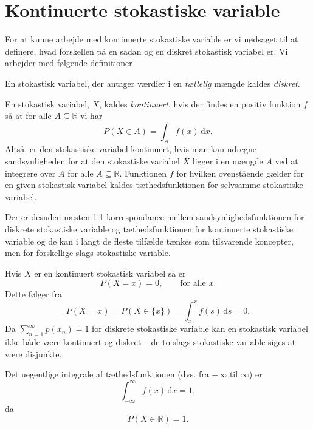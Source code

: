 \section{Kontinuerte stokastiske variable}
For at kunne arbejde med kontinuerte stokastiske variable er vi nødsaget til at definere, hvad forskellen på en sådan og en diskret stokastisk variabel er. Vi arbejder med følgende definitioner
\begin{definition}
  En stokastisk variabel, der antager værdier i en \textit{tællelig} mængde kaldes \textit{diskret}.
\end{definition}

\begin{definition}
  En stokastisk variabel, $X$, kaldes \textit{kontinuert}, hvis der findes en positiv funktion $f$ så at for alle $A \subseteq \mathbb{R}$ vi har
  \[ 
  P(X \in A) = \int_A f(x) \, \mathrm{d}x
  .\]
  Altså, er den stokastiske variabel kontinuert, hvis man kan udregne sandsynligheden for at den stokastiske variabel $X$ ligger i en mængde $A$ ved at integrere over $A$ for alle $A \subseteq \mathbb{R}$. Funktionen $f$ for hvilken ovenstående gælder for en given stokastisk variabel kaldes tæthedsfunktionen for selvsamme stokastiske variabel.
\end{definition}

Der er desuden næsten 1:1 korrespondance mellem sandsynlighedsfunktionen for diskrete stokastiske variable og tæthedsfunktionen for kontinuerte stokastiske variable og de kan i langt de fleste tilfælde tænkes som tilsvarende koncepter, men for forskellige slags stokastiske variable.

\begin{sæt}
  Hvis $X$ er en kontinuert stokastisk variabel så er
  \[ 
  P(X = x) = 0, \qquad \text{for alle } x
  .\]
  Dette følger fra
  \[ 
  P(X = x) = P(X \in \{ x \} ) = \int_{x}^{x} f(s) \, \mathrm{d}s = 0
  .\]
  Da $\sum_{n = 1}^{\infty} p(x_n) = 1$ for diskrete stokastiske variable kan en stokastisk variabel ikke både være kontinuert og diskret -- de to slags stokastiske variable siges at være disjunkte.
\end{sæt}

Det uegentlige integrale af tæthedsfunktionen (dvs. fra $-\infty$ til $\infty$) er
\[ 
  \int_{-\infty}^{\infty} f(x) \, \mathrm{d}x = 1
,\]
da
\[ 
  P(X \in \mathbb{R}) = 1
.\]

